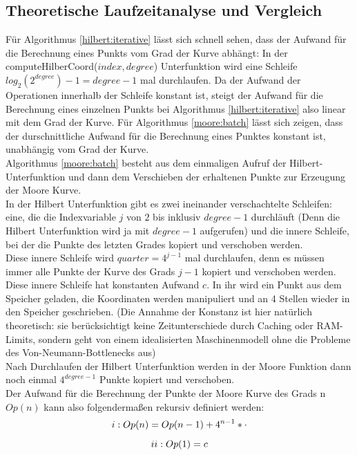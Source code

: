 \documentclass[course=erap]{aspdoc}
\newcommand{\uproman}[1]{\uppercase\expandafter{\romannumeral#1}}
\begin{document}
\subsection{Theoretische Laufzeitanalyse und Vergleich}
Für Algorithmus \ref{hilbert:iterative} lässt sich schnell sehen, dass der Aufwand für die Berechnung eines Punkts vom Grad der Kurve abhängt: In der computeHilberCoord($index, degree$) Unterfunktion wird eine Schleife $log_2(2^{degree})-1 = degree -1$ mal durchlaufen. Da der Aufwand der Operationen innerhalb der Schleife konstant ist, steigt der Aufwand für die Berechnung eines einzelnen Punkts bei Algorithmus \ref{hilbert:iterative} also linear mit dem Grad der Kurve.
\newline
Für Algorithmus \ref{moore:batch} lässt sich zeigen, dass der durschnittliche Aufwand für die Berechnung eines Punktes konstant ist, unabhängig vom Grad der Kurve. \\
Algorithmus \ref{moore:batch} besteht aus dem einmaligen Aufruf der Hilbert-Unterfunktion und dann dem Verschieben der erhaltenen Punkte zur Erzeugung der Moore Kurve. \\
In der Hilbert Unterfunktion gibt es zwei ineinander verschachtelte Schleifen: eine, die die Indexvariable $j$ von $2$ bis inklusiv  $degree -1$ durchläuft (Denn die Hilbert Unterfunktion wird ja mit $degree-1$ aufgerufen) und die innere Schleife, bei der die Punkte des letzten Grades kopiert und verschoben werden. \\ 
Diese innere Schleife wird $quarter = 4^{j-1}$ mal durchlaufen, denn es müssen immer alle Punkte der Kurve des Grads $j-1$ kopiert und verschoben werden. Diese innere Schleife hat konstanten Aufwand $c$. In ihr wird ein Punkt aus dem Speicher  geladen, die Koordinaten werden manipuliert und an 4 Stellen wieder in den Speicher geschrieben. (Die Annahme der Konstanz ist hier natürlich theoretisch: sie berücksichtigt keine Zeitunterschiede durch Caching oder RAM-Limits, sondern geht von einem idealisierten Maschinenmodell ohne die Probleme des Von-Neumann-Bottlenecks aus)\\
Nach Durchlaufen der Hilbert Unterfunktion werden in der Moore Funktion dann noch einmal  $4^{degree-1}$ Punkte kopiert und verschoben. \\ Der Aufwand für die Berechnung der Punkte der Moore Kurve des Grads n $Op(n)$ kann also folgendermaßen rekursiv definiert werden: \ \\
\[\uproman{1}: Op(n) = Op(n-1) + 4^{n-1}*\cdot\]
\[\uproman{2}: Op(1) = c\] \ \\ 
\end{document}
